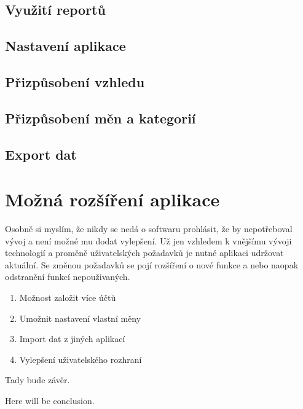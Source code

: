 \documentclass[
  biblatex,
  figures=false,
  tables=false,
  glossaries,
  index
]{kidiplom}
\begin{document}
\subsection{Využití reportů}

\subsection{Nastavení aplikace}

\subsection{Přizpůsobení vzhledu}

\subsection{Přizpůsobení měn a kategorií}

\subsection{Export dat}


\section{Možná rozšíření aplikace}
Osobně si myslím, že nikdy se nedá o softwaru prohlásit, že by nepotřeboval vývoj a není možné mu dodat vylepšení. Už jen vzhledem k vnějšímu vývoji technologií a proměně uživatelských požadavků je nutné aplikaci udržovat aktuální. Se změnou požadavků se pojí rozšíření o nové funkce a nebo naopak odstranění funkcí nepouživaných.

\begin{enumerate}
  \item Možnost založit více účtů
  \item Umožnit nastavení vlastní měny
  \item Import dat z jiných aplikací
  \item Vylepšení uživatelského rozhraní
\end{enumerate}

\begin{kiconclusions}
Tady bude závěr.
\end{kiconclusions}

\begin{kiconclusions}[english]
Here will be conclusion.
\end{kiconclusions}

\end{document}
